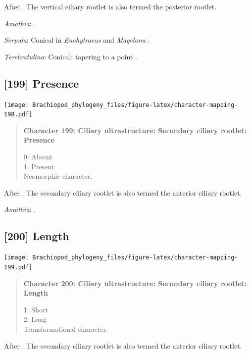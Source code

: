 \documentclass[openany]{book}
\begin{document}
After \citet{Lundin2009}. The vertical ciliary rootlet is also termed
the posterior rootlet.

\hypertarget{Amathia-coding-198}{}
\emph{Amathia}: \citet{Reed1982}.

\hypertarget{Serpula-coding-198}{}
\emph{Serpula}: Conical in \emph{Enchytraeus} \citep{Reger1967} and
\emph{Magelona} \citep{Bartolomaeus1995}.

\hypertarget{Terebratulina-coding-198}{}
\emph{Terebratulina}: Conical: tapering to a point \citep{Luter1995}.

\subsection*{{[}199{]} Presence}\label{presence-4}

\texttt{[image: Brachiopod\_phylogeny\_files/figure-latex/character-mapping-198.pdf]}

\begin{quote}
\textbf{Character 199: Ciliary ultrastructure: Secondary ciliary
rootlet: Presence}

0: Absent\\
1: Present\\
Neomorphic character.
\end{quote}

After \citet{Lundin2009}. The secondary ciliary rootlet is also termed
the anterior ciliary rootlet.

\hypertarget{Amathia-coding-199}{}
\emph{Amathia}: \citet{Reed1982}.

\subsection*{{[}200{]} Length}\label{length-1}

\texttt{[image: Brachiopod\_phylogeny\_files/figure-latex/character-mapping-199.pdf]}

\begin{quote}
\textbf{Character 200: Ciliary ultrastructure: Secondary ciliary
rootlet: Length}

1: Short\\
2: Long\\
Transformational character.
\end{quote}

After \citet{Lundin2009}. The secondary ciliary rootlet is also termed
the anterior ciliary rootlet.
\end{document}
